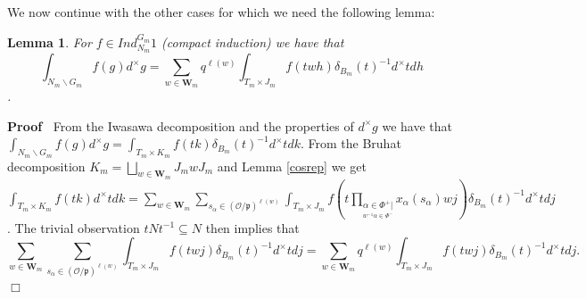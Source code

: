 \documentclass{article}
\newenvironment{proof}{\noindent\textbf{Proof\ }}{\hspace*{\fill}$\Box$\medskip}
\newtheorem{lemma}{Lemma}
\begin{document}
We now continue with the other cases for which we need the following lemma: 
\begin{lemma} \label{varchange}
    For $f\in Ind_{N_m}^{G_m}1$ (compact induction) we have that $$\int_{N_m\backslash G_m}f(g)d^{\times}g=\sum\limits_{w\in\mathbf{W}_m}q^{\ell(w)}\int_{T_m\times J_m}f(twh)\delta_{B_m}(t)^{-1}d^{\times}tdh$$.
\end{lemma}
\begin{proof}
    From the Iwasawa decomposition and the properties of $d^{\times}g$ we have that $\int_{N_m\backslash G_m}f(g)d^{\times}g=\int_{T_m\times K_m}f(tk)\delta_{B_m}(t)^{-1}d^{\times}tdk$. From the Bruhat decomposition $K_m=\bigsqcup\limits_{w\in\mathbf{W}_m}J_mwJ_m$ and Lemma \ref{cosrep} we get $\int_{T_m\times K_m}f(tk)d^{\times}tdk=\sum\limits_{w\in\mathbf{W}_m}\sum\limits_{s_{\alpha}\in(\mathcal{O}/\mathfrak{p})^{\ell(w)}}\int_{T_m\times J_m}f(t\prod\limits_{\underset{w^{-1}\alpha\in\Phi^-}{\alpha\in\Phi^+|}}x_{\alpha}(s_{\alpha})wj)\delta_{B_m}(t)^{-1}d^{\times}tdj$. The trivial observation $tNt^{-1}\subseteq N$ then implies that $$\sum\limits_{w\in\mathbf{W}_m}\sum\limits_{s_{\alpha}\in(\mathcal{O}/\mathfrak{p})^{\ell(w)}}\int_{T_m\times J_m}f(twj)\delta_{B_m}(t)^{-1}d^{\times}tdj=\sum\limits_{w\in\mathbf{W}_m}q^{\ell(w)}\int_{T_m\times J_m}f(twj)\delta_{B_m}(t)^{-1}d^{\times}tdj.$$
\end{proof}
\end{document}
